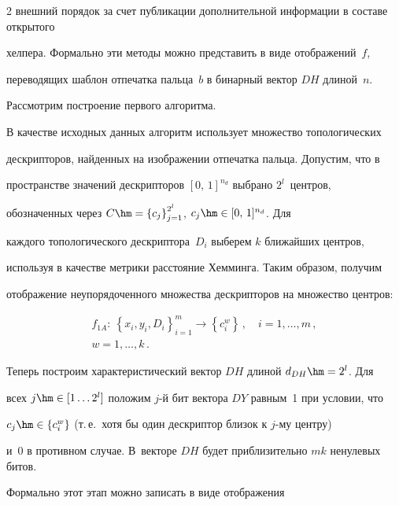 \begin{multicols}{2}
внешний порядок за счет публикации дополнительной информации в составе открытого 

хелпера. Формально эти методы можно представить в виде отображений~$f$, 

переводящих шаблон отпечатка пальца~$b$ в бинарный вектор $DH$ длиной~$n$. 

Рассмотрим построение первого алгоритма.

      

      В качестве исходных данных алгоритм использует множество топологических 

дескрипторов, найден\-ных на изображении отпечатка пальца. До\-пус\-тим, что в 

пространстве значений дескрипторов $[0,\,1]^{n_d}$ выбрано $2^l$~центров, 

обозначенных через $C\hm=\left\{ c_j\right\}^{2^l}_{j=1}$, $c_j\hm\in[0,\,1]^{n_d}$. Для 

каждого топологического дескриптора~$D_i$ выберем $k$ ближайших центров, 

используя в качестве метрики расстояние Хемминга. Таким образом, получим 

отображение неупорядоченного множества дескрипторов на множество центров:

      \begin{multline*}

      f_{1A}:\ \left\{ x_i,y_i,D_i\right\}^m_{i=1}\rightarrow \left\{ c_i^w\right\}\,,\quad 

i=1, \ldots ,m\,,\\ 

w=1,\ldots , k\,.


      \end{multline*}

      

      Теперь построим характеристический вектор $DH$ длиной $d_{DH}\hm = 2^l$. Для 

всех $j\hm\in [1\ldots 2^l]$ положим $j$-й бит вектора $DY$ равным~1 при условии, что 

$c_j\hm\in \left\{ c_i^w\right\}$ (т.\,е.\ хотя бы один дескриптор близок к $j$-му центру) 

и~0 в противном случае. В~векторе $DH$ будет приблизительно $mk$ ненулевых битов. 

Формально этот этап можно записать в виде отоб\-ра\-жения

      \begin{multline*}


\end{multline*}
\end{multicols}
